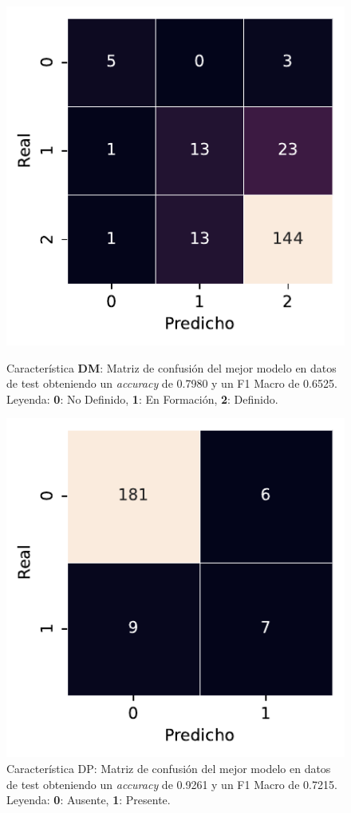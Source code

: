 \begin{figure}[htbp]
    \includegraphics[width=0.4\linewidth]{figures/5_experiments/multi-dm-cm.pdf}
    \caption[Característica DM: Matriz de confusión del mejor modelo en datos de test.]{Característica \textbf{DM}: Matriz de confusión del mejor modelo en datos de test obteniendo un \textit{accuracy} de 0.7980 y un F1 Macro de 0.6525. Leyenda: \textbf{0}: No Definido, \textbf{1}: En Formación, \textbf{2}: Definido.}
    \label{fig5:DM_confusion_matrix}
    \includegraphics[width=0.4\linewidth]{figures/5_experiments/multi-dp-cm.pdf}
    \caption[Característica DP: Matriz de confusión del mejor modelo en datos de test.]{Característica DP: Matriz de confusión del mejor modelo en datos de test obteniendo un \textit{accuracy} de 0.9261 y un F1 Macro de 0.7215. Leyenda: \textbf{0}: Ausente, \textbf{1}: Presente.}
    \label{fig5:DP_confusion_matrix}
\end{figure}

